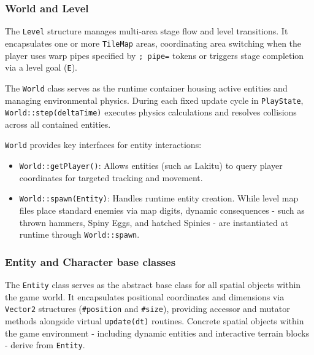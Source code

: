 \documentclass[12pt, a4paper]{article}
\begin{document}
\newpage

\subsubsection{World and Level}

The \texttt{Level} structure manages multi-area stage flow and level transitions. It encapsulates one or more \texttt{TileMap} areas, coordinating area switching when the player uses warp pipes specified by \texttt{; pipe=} tokens or triggers stage completion via a level goal (\texttt{E}).

The \texttt{World} class serves as the runtime container housing active entities and managing environmental physics. During each fixed update cycle in \texttt{PlayState}, \texttt{World::step(deltaTime)} executes physics calculations and resolves collisions across all contained entities.

\texttt{World} provides key interfaces for entity interactions:
\begin{itemize}
\item \texttt{World::getPlayer()}: Allows entities (such as Lakitu) to query player coordinates for targeted tracking and movement.
\item \texttt{World::spawn(Entity)}: Handles runtime entity creation. While level map files place standard enemies via map digits, dynamic consequences - such as thrown hammers, Spiny Eggs, and hatched Spinies - are instantiated at runtime through \texttt{World::spawn}.
\end{itemize}
\subsubsection{Entity and Character base classes}

The \texttt{Entity} class serves as the abstract base class for all spatial objects within the game world. It encapsulates positional coordinates and dimensions via \texttt{Vector2} structures (\texttt{\#position} and \texttt{\#size}), providing accessor and mutator methods alongside virtual \texttt{update(dt)} routines. Concrete spatial objects within the game environment - including dynamic entities and interactive terrain blocks - derive from \texttt{Entity}.
\end{document}
